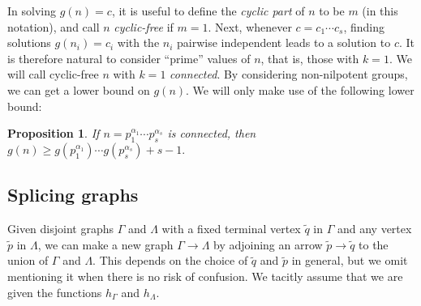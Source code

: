 \documentclass{article}
\newcommand{\ufdsh}{p_1^{\alpha_1} \cdots p_s^{\alpha_s}}
\newcommand{\qo}{\tilde{q}}
\newcommand{\pin}{\tilde{p}}
\theoremstyle{plain}
\newtheorem{prop}{Proposition}[section]
\theoremstyle{definition}
\begin{document}
In solving $g(n) = c$, it is useful to define the \emph{cyclic part} of $n$ to be $m$ (in this notation), and call $n$ \emph{cyclic-free} if $m = 1$. Next, whenever $c = c_1 \cdots c_s$, finding solutions $g(n_i) = c_i$ with the $n_i$ pairwise independent leads to a solution to $c$. It is therefore natural to consider ``prime'' values of $n$, that is, those with $k = 1$. We will call cyclic-free $n$ with $k = 1$ \emph{connected}. By considering non-nilpotent groups, we can get a lower bound on $g(n)$. We will only make use of the following lower bound:

\begin{prop}
	If $n = \ufdsh$ is connected, then $g(n) \ge g(p_1^{\alpha_1})\cdots g(p_s^{\alpha_s}) + s - 1.$
\end{prop}

\subsection{Splicing graphs}
Given disjoint graphs $\Gamma$ and $\Lambda$ with a fixed terminal vertex $\qo$ in $\Gamma$ and any vertex $\pin$ in $\Lambda$, we can make a new graph $\Gamma \rightarrow \Lambda$ by adjoining an arrow $\pin \rightarrow \qo$ to the union of $\Gamma$ and $\Lambda$. This depends on the choice of $\qo$ and $\pin$ in general, but we omit mentioning it when there is no risk of confusion. We tacitly assume that we are given the functions $h_\Gamma$ and $h_\Lambda$.
\end{document}
